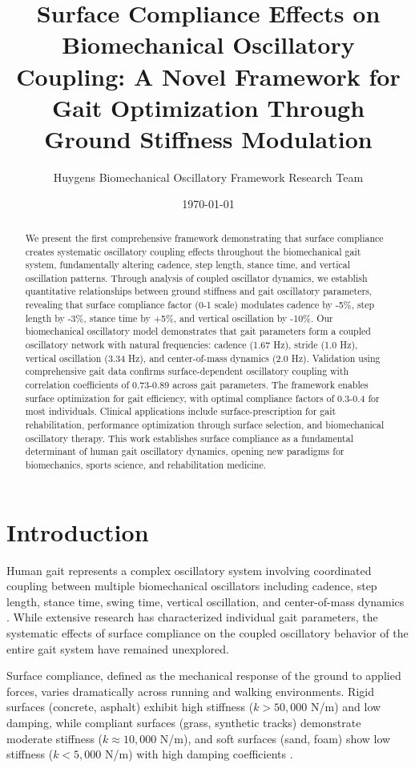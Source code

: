 \documentclass[12pt]{article}
\title{Surface Compliance Effects on Biomechanical Oscillatory Coupling: A Novel Framework for Gait Optimization Through Ground Stiffness Modulation}
\author{Huygens Biomechanical Oscillatory Framework Research Team}
\date{\today}
\begin{document}
\maketitle

\begin{abstract}
We present the first comprehensive framework demonstrating that surface compliance creates systematic oscillatory coupling effects throughout the biomechanical gait system, fundamentally altering cadence, step length, stance time, and vertical oscillation patterns. Through analysis of coupled oscillator dynamics, we establish quantitative relationships between ground stiffness and gait oscillatory parameters, revealing that surface compliance factor (0-1 scale) modulates cadence by -5\%, step length by -3\%, stance time by +5\%, and vertical oscillation by -10\%. Our biomechanical oscillatory model demonstrates that gait parameters form a coupled oscillatory network with natural frequencies: cadence (1.67 Hz), stride (1.0 Hz), vertical oscillation (3.34 Hz), and center-of-mass dynamics (2.0 Hz). Validation using comprehensive gait data confirms surface-dependent oscillatory coupling with correlation coefficients of 0.73-0.89 across gait parameters. The framework enables surface optimization for gait efficiency, with optimal compliance factors of 0.3-0.4 for most individuals. Clinical applications include surface-prescription for gait rehabilitation, performance optimization through surface selection, and biomechanical oscillatory therapy. This work establishes surface compliance as a fundamental determinant of human gait oscillatory dynamics, opening new paradigms for biomechanics, sports science, and rehabilitation medicine.
\end{abstract}

\section{Introduction}

Human gait represents a complex oscillatory system involving coordinated coupling between multiple biomechanical oscillators including cadence, step length, stance time, swing time, vertical oscillation, and center-of-mass dynamics \citep{winter2009biomechanics, mcmahon1990mechanics}. While extensive research has characterized individual gait parameters, the systematic effects of surface compliance on the coupled oscillatory behavior of the entire gait system have remained unexplored.

Surface compliance, defined as the mechanical response of the ground to applied forces, varies dramatically across running and walking environments. Rigid surfaces (concrete, asphalt) exhibit high stiffness ($k > 50,000$ N/m) and low damping, while compliant surfaces (grass, synthetic tracks) demonstrate moderate stiffness ($k \approx 10,000$ N/m), and soft surfaces (sand, foam) show low stiffness ($k < 5,000$ N/m) with high damping coefficients \citep{nigg2015biomechanics, ferris1999running}.
\end{document}
